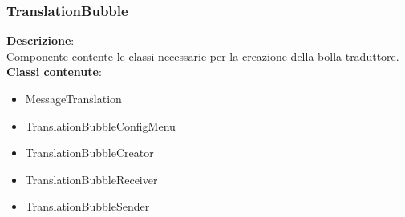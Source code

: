\subsubsection{TranslationBubble}
   \FloatBarrier
\FloatBarrier
\textbf{Descrizione}:\\
 Componente contente le classi necessarie per la creazione della bolla traduttore. 
\\ \textbf{Classi contenute}:\\
\begin{itemize}
\item MessageTranslation
\item TranslationBubbleConfigMenu
\item TranslationBubbleCreator
\item TranslationBubbleReceiver
\item TranslationBubbleSender
\end{itemize}


